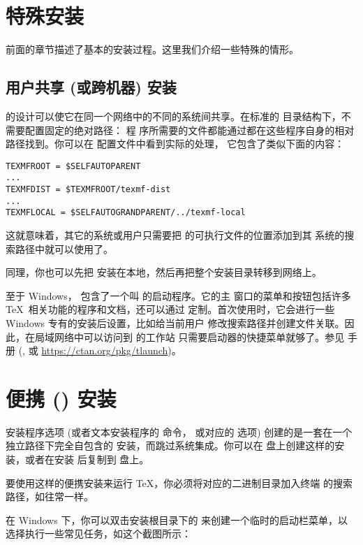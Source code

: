 \documentclass{article}
\begin{document}
\section{特殊安装}

前面的章节描述了基本的安装过程。这里我们介绍一些特殊的情形。

\subsection{用户共享 (或跨机器) 安装}
\label{sec:sharedinstall}

\TL{} 的设计可以使它在同一个网络中的不同的系统间共享。在标准的
目录结构下，不需要配置固定的绝对路径：\TL{} 程
序所需要的文件都能通过都在这些程序自身的相对路径找到。你可以在
 配置文件中看到实际的处理，
它包含了类似下面的内容：
\begin{verbatim}
TEXMFROOT = $SELFAUTOPARENT
...
TEXMFDIST = $TEXMFROOT/texmf-dist
...
TEXMFLOCAL = $SELFAUTOGRANDPARENT/../texmf-local
\end{verbatim}
这就意味着，其它的系统或用户只需要把 \TL{} 的可执行文件的位置添加到其
系统的搜索路径中就可以使用了。

同理，你也可以先把 \TL{} 安装在本地，然后再把整个安装目录转移到网络上。

至于 Windows，\TL{} 包含了一个叫  的启动程序。它的主
窗口的菜单和按钮包括许多 \TeX\ 相关功能的程序和文档，还可以通过 
定制。首次使用时，它会进行一些 Windows 专有的安装后设置，比如给当前用户
修改搜索路径并创建文件关联。因此，在局域网络中可以访问到 \TL{} 的工作站
只需要启动器的快捷菜单就够了。参见  手册 (,
或 \url{https://ctan.org/pkg/tlaunch})。

\section{便携 (\USB{}) 安装}
\label{sec:portable-tl}

 安装程序选项 (或者文本安装程序的  命令，
或对应的 \GUI{} 选项) 创建的是一套在一个独立路径下完全自包含的 \TL{}
安装，而跳过系统集成。你可以在 \USB{} 盘上创建这样的安装，或者在安装
后复制到 \USB{} 盘上。

要使用这样的便携安装来运行 \TeX{}，你必须将对应的二进制目录加入终端
的搜索路径，如往常一样。

在 Windows 下，你可以双击安装根目录下的 
来创建一个临时的启动栏菜单，以选择执行一些常见任务，如这个截图所示：
\end{document}
